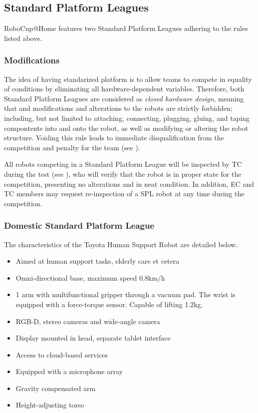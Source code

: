 \subsection{Standard Platform Leagues}
RoboCup@Home features two Standard Platform Leagues adhering to the rules listed above.

\subsubsection{Modifications}
\label{rule:spl-mods}
The idea of having standarized platform is to allow teams to compete in equality of conditions by eliminating all hardware-dependent variables. Therefore, both Standard Platform Leagues are considered as \emph{closed hardware design}, meaning that and modifications and alterations to the robots are strictly forbidden; including, but not limited to attaching, connecting, plugging, gluing, and taping compontents into and onto the robot, as well as modifying or altering the robot structure. Voiding this rule leads to immediate disqualification from the competition and penalty for the team (see ).

All robots competing in a Standard Platform League will be inspected by TC during the  test (see ), who will verify that the robot is in proper state for the competition, presenting no alterations and in neat condition. In addition, EC and TC members may request re-inspection of a SPL robot at any time during the competition.

\subsubsection{Domestic Standard Platform League}
The characteristics of the Toyota Human Support Robot are detailed below. 

\begin{itemize}
    \item Aimed at human support tasks, elderly care et cetera
    \item Omni-directional base, maximum speed 0.8km/h
    \item 1 arm with multifunctional gripper through a vacuum pad. The wrist is equipped with a force-torque sensor. Capable of lifting 1.2kg. 
    \item RGB-D, stereo cameras and wide-angle camera
    \item Display mounted in head, separate tablet interface
    \item Access to cloud-based services
    \item Equipped with a microphone array
    \item Gravity compensated arm
    \item Height-adjusting torso
\end{itemize}

